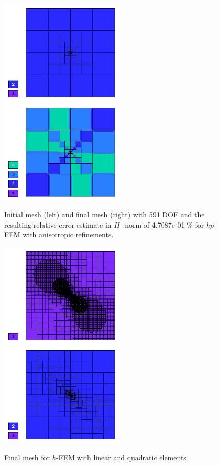 \documentclass[12pt]{elsarticle}
\begin{document}
\begin{figure}[!ht]
\centering
\includegraphics[height=5cm]{nist/nist-11/mesh_hp_aniso_init.png}\ \
\includegraphics[height=5cm]{nist/nist-11/mesh_hp_aniso.png}
\caption{Initial mesh (left) and final mesh (right) with 591 DOF and the resulting relative error estimate in $H^1$-norm of 4.7087e-01 \% for $hp$-FEM with anisotropic refinements.}
\label{fig:nist-11-hp-aniso}
\end{figure}

\begin{figure}[!ht]
\centering
\includegraphics[height=5cm]{nist/nist-11/mesh_h1_aniso.png}\ \
\includegraphics[height=5cm]{nist/nist-11/mesh_h2_aniso.png}
\caption{Final mesh for $h$-FEM with linear and quadratic elements.}
\label{fig:nist-11-h-aniso}
\end{figure}
\end{document}
